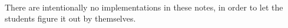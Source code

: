 \documentclass[a4paper]{article}
\begin{document}


\tableofcontents

~

There are intentionally no implementations in these notes,
in order to let the students figure it out by themselves.






\end{document}
